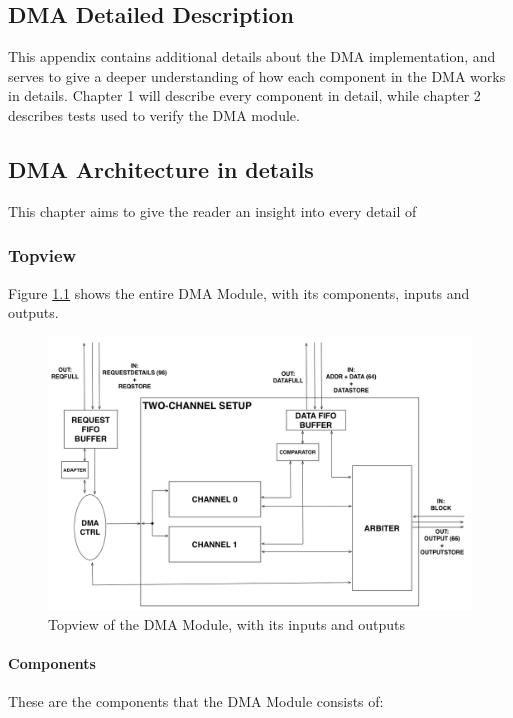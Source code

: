 \begin{appendix}

\chapter{DMA Detailed Description}
\label{app:DMA-arch}
This appendix contains additional details about the DMA implementation, and serves to give a deeper understanding of how each component in the DMA works in details.
Chapter 1 will describe every component in detail, while chapter 2 describes tests used to verify the DMA module.
\section{DMA Architecture in details}
This chapter aims to give the reader an insight into every detail of
\subsection{Topview}
Figure \ref{fig:TopViewFinalSimple2IO} shows the entire DMA Module, with its components,  inputs and outputs.


\begin{figure}[h!]
    \centering
    \includegraphics[width=1.0\textwidth]{Figures/DMA/TopViewFinalSimple2IO}
    \caption{Topview of the DMA Module, with its inputs and outputs}
    \label{fig:TopViewFinalSimple2IO}
\end{figure}

\subsubsection{Components}
These are the components that the DMA Module consists of:


\end{appendix}
